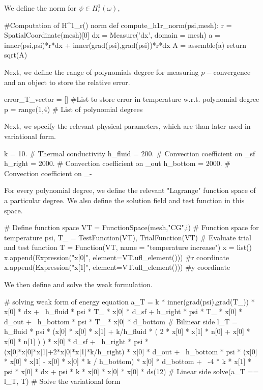 We define the norm for $\psi \in H^1_r(\omega)$,
\begin{python}
#Computation of H^1_r(\omega) norm
def compute_h1r_norm(psi,mesh):
	r = SpatialCoordinate(mesh)[0]
	dx = Measure('dx', domain = mesh)
	a = inner(psi,psi)*r*dx + inner(grad(psi),grad(psi))*r*dx
	A = assemble(a)
	return sqrt(A)
\end{python}

Next, we define the range of polynomials degree for measuring $p-$convergence and an object to store the relative error.
\begin{python}
error_T_vector = [] #List to store error in temperature w.r.t. polynomial degree
p = range(1,4) # List of polynomial degrees
\end{python}

Next, we specify the relevant physical parameters, which are than later used in variational form.
\begin{python}
k = 10. # Thermal conductivity
h_fluid = 200. # Convection coefficient on \gamma_{sf}
h_right = 2000. # Convection coefficient on \gamma_{out}
h_bottom = 2000. # Convection coefficient on \gamma_{-}
\end{python}

For every polynomial degree, we define the relevant "Lagrange" function space of a particular degree. We also define the solution field and test function in this space.
\begin{python}
# Define function space
VT = FunctionSpace(mesh,"CG",i) # Function space for temperature
psi, T_ = TestFunction(VT), TrialFunction(VT) # Evaluate trial and test function
T = Function(VT, name = "temperature increase")
x = list()
x.append(Expression("x[0]", element=VT.ufl_element())) #r coordinate
x.append(Expression("x[1]", element=VT.ufl_element())) #y coordinate
\end{python}

We then define and solve the weak formulation.
\begin{python}
# solving weak form of energy equation
a_T = k * inner(grad(psi),grad(T_)) * x[0] * dx + \
	h_fluid * psi * T_ * x[0] * d_sf + h_right * psi * T_ * x[0] * d_out + \
	h_bottom * psi * T_ * x[0] * d_bottom # Bilinear side
l_T = h_fluid * psi * (x[0] * x[0] * x[1] + k/h_fluid * ( 2 * x[0] * x[1] * n[0] + x[0] * x[0] * n[1] ) ) * x[0] * d_sf + \
	h_right * psi * (x[0]*x[0]*x[1]+2*x[0]*x[1]*k/h_right) * x[0] * d_out + \
	h_bottom * psi * (x[0] * x[0] * x[1] - x[0] * x[0] * k / h_bottom) * x[0] * d_bottom + \
	-4 * k * x[1] * psi * x[0] * dx + psi * k * x[0] * x[0] * x[0] * ds(12) # Linear side
solve(a_T == l_T, T) # Solve the variational form
\end{python}

